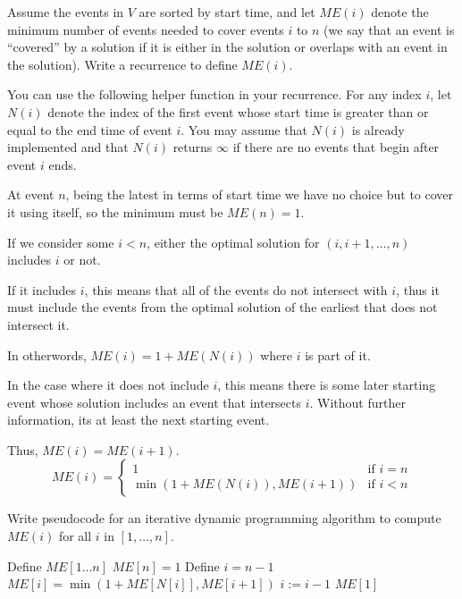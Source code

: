 \begin{questions}
	\question[4] Assume the events in $V$ are sorted by start time, and let $ME(i)$ denote the minimum number of events needed to cover events $i$ to $n$ (we say that an event is ``covered'' by a solution if it is either in the solution or overlaps with an event in the solution). Write a recurrence to define $ME(i)$.

	You can use the following helper function in your recurrence. For any index $i$, let $N(i)$ denote the index of the first event whose start time is greater than or equal to the end time of event $i$. You may assume that $N(i)$ is already implemented and that $N(i)$ returns $\infty$ if there are no events that begin after event $i$ ends.

	\ifsolutions\fi


	\begin{soln}
		At event \(n\), being the latest in terms of start time we have no choice but to cover it using itself, so the minimum must be \(ME(n) = 1\).

		If we consider some \(i < n\), either the optimal solution for \((i, i + 1, \dots, n)\) includes \(i\) or not.

		If it includes \(i\), this means that all of the events do not intersect with \(i\), thus it must include the events from the optimal solution of the earliest that does not intersect it.

		In otherwords, \(ME(i) = 1 + ME(N(i))\) where \(i\) is part of it.

		In the case where it does not include \(i\), this means there is some later starting event whose solution includes an event that intersects \(i\). Without further information, its at least the next starting event.

		Thus, \(ME(i) = ME(i+1)\).
		\[
			ME(i) = \begin{cases}
				1                              & \text{if } i = n \\
				\min(1 + ME(N(i)),  ME(i + 1)) & \text{if } i < n
			\end{cases}
		\]


	\end{soln}

	\question[4] Write pseudocode for an iterative dynamic programming algorithm to compute $ME(i)$ for all $i$ in $[1, \ldots, n]$.
	\ifsolutions\fi
	\begin{soln}
		\begin{algorithmic}[1]
			\State Define $ME[1 \dots n]$
			\State $ME[n] = 1$
			\State Define $i = n - 1$
			\State $ME[i] = \min(1 + ME[N[i]], ME[i+1])$
			\State $i := i - 1$
			\EndWhile
			\State \Return $ME[1]$
			\EndProcedure
		\end{algorithmic}
	\end{soln}


\end{questions}
